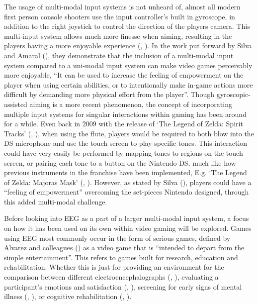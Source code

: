 \documentclass[11pt, a4paper]{article}
\newcommand{\ccite}[1]{(\citeauthor{#1}, \citeyear{#1})}
\newcommand{\cciteyear}[1]{(\citeyear{#1})}
\begin{document}
The usage of multi-modal input systems is not unheard of, almost all modern first person console shooters use the input controller's built in gyroscope, in addition to the right joystick to control the direction of the players camera. This multi-input system allows much more finesse when aiming, resulting in the players having a more enjoyable experience \ccite{toktacs2019evaluation}. In the work put forward by Silva and Amaral \cciteyear{da2014multimodal}, they demonstrate that the inclusion of a multi-modal input system compared to a uni-modal input system can make video games perceivably more enjoyable, ``It can be used to increase the feeling of empowerment on the player when using certain abilities, or to intentionally make in-game actions more difficult by demanding more physical effort from the player''. Though gyroscopic-assisted aiming is a more recent phenomenon, the concept of incorporating multiple input systems for singular interactions within gaming has been around for a while. Even back in 2009 with the release of `The Legend of Zelda: Spirit Tracks' \ccite{thelegendofzelda_spirittracks}, when using the flute, players would be required to both blow into the DS microphone and use the touch screen to play specific tones. This interaction could have very easily be performed by mapping tones to regions on the touch screen, or pairing each tone to a button on the Nintendo DS, much like how previous instruments in the franchise have been implemented, E.g. `The Legend of Zelda: Majoras Mask' \ccite{thelegendofzelda_majorasmask}. However, as stated by Silva \cciteyear{da2014multimodal}, players could have a ``feeling of empowerment'' overcoming the set-pieces Nintendo designed, through this added multi-modal challenge.

\hfill

Before looking into EEG as a part of a larger multi-modal input system, a focus on how it has been used on its own within video gaming will be explored. Games using EEG most commonly occur in the form of serious games, defined by Alvarez and colleagues \cciteyear{alvarez2011introduction} as a video game that is ``intended to depart from the simple entertainment''. This refers to games built for research, education and rehabilitation. Whether this is just for providing an environment for the comparison between different electroencephalographs \ccite{liarokapis2014comparing}, evaluating a participant's emotions and satisfaction \ccite{vourvopoulos2013brain}, screening for early signs of mental illness \ccite{tarnanas2015comparison}, or cognitive rehabilitation \ccite{alchalcabi2017more}. 
\end{document}
